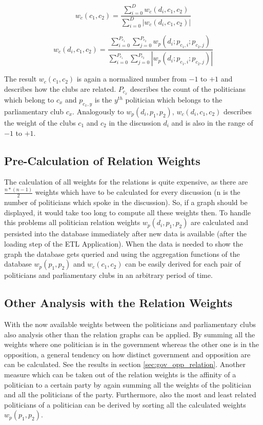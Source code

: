 $$
w_c(c_1,c_2) = \frac{\displaystyle\sum_{i=0}^{D} w_c(d_i,c_1,c_2)}{\displaystyle\sum_{i=0}^{D} |w_c(d_i,c_1,c_2)|}
$$

$$
w_c(d_i,c_1,c_2) = \frac{\displaystyle\sum_{i=0}^{P_{c_1}} \displaystyle\sum_{j=0}^{P_{c_2}} w_p(d_i;p_{c_1,i};p_{c_2,j})}{\displaystyle\sum_{i=0}^{P_{c_1}} \displaystyle\sum_{j=0}^{P_{c_2}} |w_p(d_i;p_{c_1,i};p_{c_2,j})|}
$$

The result $w_c(c_1,c_2)$ is again a normalized number from $-1$ to $+1$ and describes how the clubs are related. $P_{c_x}$ describes the count of the politicians which belong to $c_x$ and $p_{c_x,y}$ is the $y^{th}$ politician which belongs to the parliamentary club $c_x$. Analogously to $w_p(d_i,p_1,p_2)$, $w_c(d_i,c_1,c_2)$ describes the weight of the clubs $c_1$ and $c_2$ in the discussion $d_i$ and is also in the range of $-1$ to $+1$.

\subsection{Pre-Calculation of Relation Weights}
The calculation of all weights for the relations is quite expensive, as there are $\frac{n * (n - 1)}{2}$ weights which have to be calculated for every discussion (n is the number of politicians which spoke in the discussion). So, if a graph should be displayed, it would take too long to compute all these weights then. To handle this problems all politician relation weights $w_p(d_i,p_1,p_2)$ are calculated and persisted into the database immediately after new data is available (after the loading step of the ETL Application). When the data is needed to show the graph the database gets queried and using the aggregation functions of the database $w_p(p_1,p_2)$ and $w_c(c_1,c_2)$ can be easily derived for each pair of politicians and parliamentary clubs in an arbitrary period of time.

\subsection{Other Analysis with the Relation Weights}
With the now available weights between the politicians and parliamentary clubs also analysis other than the relation graphs can be applied. By summing all the weights where one politician is in the government whereas the other one is in the opposition, a general tendency on how distinct government and opposition are can be calculated. See the results in section \ref{sec:gov_opp_relation}.  Another measure which can be taken out of the relation weights is the affinity of a politician to a certain party by again summing all the weights of the politician and all the politicians of the party. Furthermore, also the most and least related politicians of a politician can be derived by sorting all the calculated weights $w_p(p_1,p_2)$.



